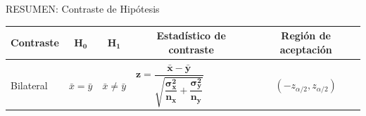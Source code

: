 \begin{myblock}{RESUMEN: Contraste de Hipótesis}
\begin{table}[H]
\begin{tabular}{l|c|c|l|c}
\textbf{Contraste} & $\boldsymbol{H_0}$    & $\boldsymbol{H_1}$    & \multicolumn{1}{c|}{\textbf{Estadístico de contraste}}                                               & \textbf{Región de aceptación}  \\ \hline
                   & \multicolumn{1}{l|}{} & \multicolumn{1}{l|}{} &                                                                                                      & \multicolumn{1}{l}{}           \\
Bilateral          & $\bar x = \bar y$     & $\bar x \neq \bar y$  & $\boldsymbol{ z=\dfrac{\bar x - \bar y}{\sqrt{ \dfrac{\sigma_x^2}{n_x}+\dfrac{\sigma_y^2}{n_y} }} }$ & $(-z_{\alpha/2},z_{\alpha/2})$ \\ \hline
\end{tabular}
\end{table}
	
\end{myblock}




